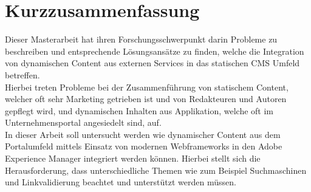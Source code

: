 \chapter*{Kurzzusammenfassung}
Dieser Masterarbeit hat ihren Forschungsschwerpunkt darin Probleme zu beschreiben und entsprechende Lösungsansätze zu finden, welche die Integration von dynamischen Content aus externen Services in das statischen CMS Umfeld betreffen. \\
Hierbei treten Probleme bei der Zusammenführung von statischem Content, welcher oft sehr Marketing getrieben ist und von Redakteuren und Autoren gepflegt wird, und dynamischen Inhalten aus Applikation, welche oft im Unternehmensportal angesiedelt sind, auf.\\
In dieser Arbeit soll untersucht werden wie dynamischer Content aus dem Portalumfeld mittels Einsatz von modernen Webframeworks in den Adobe Experience Manager integriert werden können. Hierbei stellt sich die Herausforderung, dass unterschiedliche Themen wie zum Beispiel Suchmaschinen und Linkvalidierung beachtet und unterstützt werden müssen.\\

